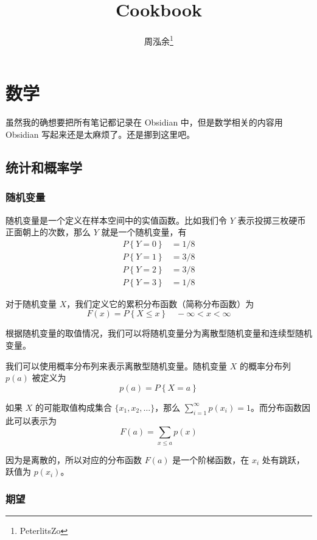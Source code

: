 \documentclass[utf8,a4paper,nofonts,9pt]{ctexbook}
\title{Cookbook}
\author{周泓余\thanks{PeterlitsZo}}
\begin{document}
\maketitle

\tableofcontents
\newpage

\chapter{数学}

虽然我的确想要把所有笔记都记录在 Obsidian 中，但是数学相关的内容用 Obsidian 写起来还是太麻烦了。还是挪到这里吧。

\section{统计和概率学}

\subsection{随机变量}

随机变量是一个定义在样本空间中的实值函数。比如我们令 $Y$ 表示投掷三枚硬币正面朝上的次数，那么 $Y$ 就是一个随机变量，有
\begin{align*}
    P\left\{Y = 0\right\} & = 1 / 8 \\
    P\left\{Y = 1\right\} & = 3 / 8 \\
    P\left\{Y = 2\right\} & = 3 / 8 \\
    P\left\{Y = 3\right\} & = 1 / 8
\end{align*}

对于随机变量 $X$，我们定义它的累积分布函数（简称分布函数）为
\[
    F(x) = P\left\{ X \le x \right\} \quad -\infty < x < \infty
\]

根据随机变量的取值情况，我们可以将随机变量分为离散型随机变量和连续型随机变量。

我们可以使用概率分布列来表示离散型随机变量。随机变量 $X$ 的概率分布列 $p(a)$ 被定义为
\[
    p(a) = P\left\{ X = a \right\}
\]

如果 $X$ 的可能取值构成集合 $\{x_1, x_2, \ldots\}$，那么 $\sum_{i = 1}^\infty p(x_i) = 1$。而分布函数因此可以表示为
\[
    F(a) = \sum_{x \le a} p(x)
\]

因为是离散的，所以对应的分布函数 $F(a)$ 是一个阶梯函数，在 $x_i$ 处有跳跃，跃值为 $p(x_i)$。

\subsection{期望}
\end{document}
